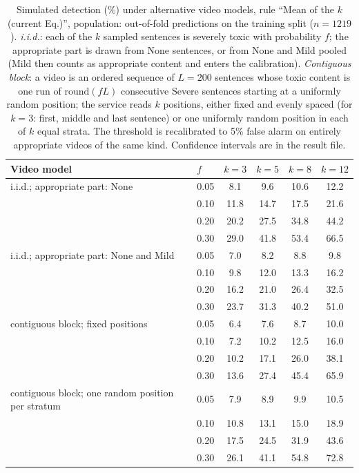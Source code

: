 \begin{table}[!t]
\centering
\caption{Simulated detection (\%) under alternative video models, rule ``Mean of the $k$ (current Eq.)'', population: out-of-fold predictions on the training split ($n = 1219$). \emph{i.i.d.}: each of the $k$ sampled sentences is severely toxic with probability $f$; the appropriate part is drawn from None sentences, or from None and Mild pooled (Mild then counts as appropriate content and enters the calibration). \emph{Contiguous block}: a video is an ordered sequence of $L = 200$ sentences whose toxic content is one run of $\mathrm{round}(fL)$ consecutive Severe sentences starting at a uniformly random position; the service reads $k$ positions, either fixed and evenly spaced (for $k = 3$: first, middle and last sentence) or one uniformly random position in each of $k$ equal strata. The threshold is recalibrated to 5\% false alarm on entirely appropriate videos of the same kind. Confidence intervals are in the result file.}
\label{tab:simulacao-variantes}
\begin{tabular}{llcccc}
\toprule
Video model & $f$ & $k=3$ & $k=5$ & $k=8$ & $k=12$ \\
\midrule
i.i.d.; appropriate part: None & 0.05 & 8.1 & 9.6 & 10.6 & 12.2 \\
 & 0.10 & 11.8 & 14.7 & 17.5 & 21.6 \\
 & 0.20 & 20.2 & 27.5 & 34.8 & 44.2 \\
 & 0.30 & 29.0 & 41.8 & 53.4 & 66.5 \\
\midrule
i.i.d.; appropriate part: None and Mild & 0.05 & 7.0 & 8.2 & 8.8 & 9.8 \\
 & 0.10 & 9.8 & 12.0 & 13.3 & 16.2 \\
 & 0.20 & 16.2 & 21.0 & 26.4 & 32.5 \\
 & 0.30 & 23.7 & 31.3 & 40.2 & 51.0 \\
\midrule
contiguous block; fixed positions & 0.05 & 6.4 & 7.6 & 8.7 & 10.0 \\
 & 0.10 & 7.2 & 10.2 & 12.5 & 16.0 \\
 & 0.20 & 10.2 & 17.1 & 26.0 & 38.1 \\
 & 0.30 & 13.6 & 27.4 & 45.4 & 65.9 \\
\midrule
contiguous block; one random position per stratum & 0.05 & 7.9 & 8.9 & 9.9 & 10.5 \\
 & 0.10 & 10.8 & 13.1 & 15.0 & 18.9 \\
 & 0.20 & 17.5 & 24.5 & 31.9 & 43.6 \\
 & 0.30 & 26.1 & 41.1 & 54.8 & 72.8 \\
\bottomrule
\end{tabular}
\end{table}
